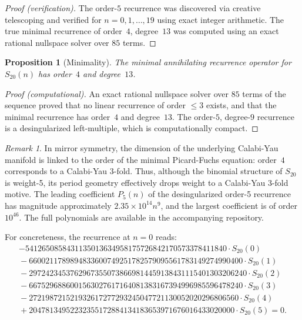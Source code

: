 \documentclass[12pt,reqno]{amsart}
\theoremstyle{plain}
\newtheorem{proposition}[theorem]{Proposition}
\theoremstyle{definition}
\theoremstyle{remark}
\newtheorem{remark}[theorem]{Remark}
\begin{document}
\begin{proof}[Proof (verification)]
The order-$5$ recurrence was discovered via creative telescoping and verified for $n = 0, 1, \ldots, 19$ using exact integer arithmetic. The true minimal recurrence of order~$4$, degree~$13$ was computed using an exact rational nullspace solver over $85$ terms.
\end{proof}

\begin{proposition}[Minimality]\label{prop:minimal}
The minimal annihilating recurrence operator for $S_{20}(n)$ has order~$4$ and degree~$13$.
\end{proposition}

\begin{proof}[Proof (computational)]
An exact rational nullspace solver over $85$ terms of the sequence proved that no linear recurrence of order $\le 3$ exists, and that the minimal recurrence has order~$4$ and degree~$13$. The order-$5$, degree-$9$ recurrence is a desingularized left-multiple, which is computationally compact.
\end{proof}

\begin{remark}
In mirror symmetry, the dimension of the underlying Calabi-Yau manifold is linked to the order of the minimal Picard-Fuchs equation: order~$4$ corresponds to a Calabi-Yau 3-fold. Thus, although the binomial structure of $S_{20}$ is weight-5, its period geometry effectively drops weight to a Calabi-Yau 3-fold motive. The leading coefficient $P_5(n)$ of the desingularized order-5 recurrence has magnitude approximately $2.35 \times 10^{14} n^9$, and the largest coefficient is of order $10^{46}$. The full polynomials are available in the accompanying repository.
\end{remark}

For concreteness, the recurrence at $n = 0$ reads:
\begin{multline}\label{eq:rec_n0}
-5412650858431135013634958175726842170573378411840 \cdot S_{20}(0) \\
{}-6600211789894833600749251782579095561783149274990400 \cdot S_{20}(1) \\
{}-29724234537629673550738669814459138431115401303206240 \cdot S_{20}(2) \\
{}-6675296886001563027617164081383167394996985596478240 \cdot S_{20}(3) \\
{}-272198721521932617277293245047721130052020296806560 \cdot S_{20}(4) \\
{}+20478134952232355172884134183653971676016433020000 \cdot S_{20}(5)
= 0.
\end{multline}
\end{document}
